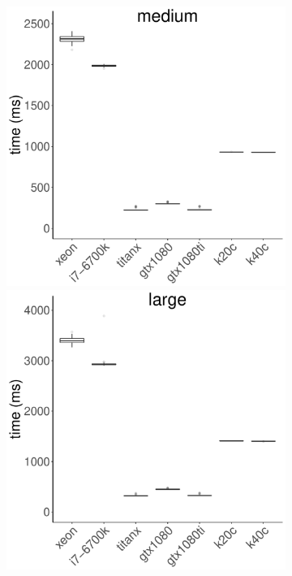 \documentclass[../document.tex]{subfiles}
\begin{document}
\begin{figure}
\begin{subfigure}{0.9\textwidth}
		\includegraphics[width=\plotwidth]{figures/time-results/generate_gem_medium_boxplot-1}
		\includegraphics[width=\plotwidth]{figures/time-results/generate_gem_large_boxplot-1}
		\end{subfigure}


\end{figure}
\end{document}
